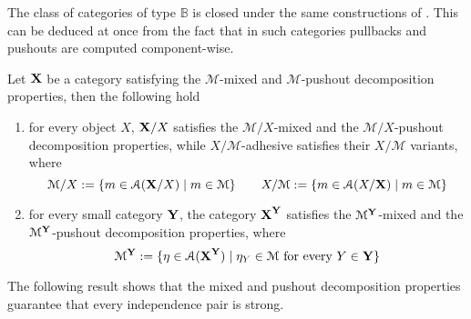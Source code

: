 \documentclass[a4paper,UKenglish,cleveref,pdftex,thm-restate,numberwithinsect]{lipics-v2021}
\def\X{\textbf {\textup{X}}}
\def\Y{\textbf {\textup{Y}}}
\begin{document}
The class of categories of type $\mathbb{B}$ is closed under the same constructions of . This can be deduced at once from the fact that in such categories pullbacks and pushouts are computed component-wise.

\begin{lemma}\label{lem:closed} Let $\X$ be a category satisfying the $\mathcal{M}$-mixed and $\mathcal{M}$-pushout decomposition properties, then the following hold
	\begin{enumerate}
		\item  for every object $X$, $\X/X$ satisfies  the $\mathcal{M}/X$-mixed and the $\mathcal{M}/X$-pushout decomposition properties, while $X/\mathcal{M}$-adhesive satisfies their $X/\mathcal{M}$ variants, where
		\[\mathcal{M}/X:=\{m\in \mathcal{A}(\X/X) \mid m\in \mathcal{M} \}
		\qquad X/\mathcal{M}:=\{m\in \mathcal{A}(X/\X) \mid m\in
		\mathcal{M} \}
		\]
		\item  for every small
		category $\Y$, the category $\X^\Y$ satisfies the 
		$\mathcal{M}^{\Y}$-mixed and the $\mathcal{M}^{\Y}$-pushout decomposition properties, where
		\[\mathcal{M}^{\Y}:=\{\eta \in \mathcal{A}(\X^\Y) \mid \eta_Y \in
		\mathcal{M} \text{ for every } Y\in \Y\}\]
	\end{enumerate}
\end{lemma}

The following result shows that the mixed and pushout decomposition properties guarantee that every independence pair is strong.
\end{document}
